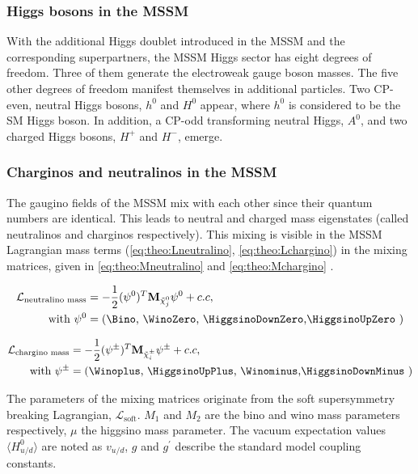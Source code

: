 \subsubsection{Higgs bosons in the MSSM}
With the additional Higgs doublet introduced in the MSSM and the corresponding superpartners, the MSSM Higgs sector has eight degrees of freedom.
Three of them generate the electroweak gauge boson masses. The five other degrees of freedom manifest themselves in additional particles. Two CP-even, neutral Higgs bosons, $h^0$ and $H^0$ appear, where $h^0$ is considered to be the SM Higgs boson. In addition, a CP-odd transforming neutral Higgs, $A^0$, and two charged Higgs bosons, $H^+$ and $H^-$, emerge.


\subsubsection{Charginos and neutralinos in the MSSM}
The gaugino fields of the MSSM mix with each other since their quantum numbers are identical. This leads to neutral and charged mass eigenstates (called neutralinos and charginos respectively). This mixing is visible in the MSSM Lagrangian mass terms (\eqref{eq:theo:Lneutralino}, \eqref{eq:theo:Lchargino}) in the mixing matrices,  given in \eqref{eq:theo:Mneutralino} and \eqref{eq:theo:Mchargino} \cite{SUSYPrimer}. 


\begin{align}
\begin{split} \mathcal{L}_\text{neutralino mass} &= - \frac{1}{2} (\psi^0)^T \textbf{M}_{\tilde{\chi}_j^0}\psi^0 + c.c , \\ 
\text{with  } \psi^0 &= \text{(\Bino, \WinoZero, \HiggsinoDownZero,\HiggsinoUpZero )} \end{split} \label{eq:theo:Lneutralino}
\end{align}

\begin{align}
\begin{split}
\mathcal{L}_\text{chargino mass} &= - \frac{1}{2} (\psi^\pm)^T \textbf{M}_{\tilde{\chi}_i^\pm}\psi^\pm + c.c , \\
\text{with  } \psi^\pm &= \text{(\Winoplus, \HiggsinoUpPlus, \Winominus,\HiggsinoDownMinus )} \end{split} \label{eq:theo:Lchargino}
\end{align}

The parameters of the mixing matrices originate from the soft supersymmetry breaking Lagrangian, $\mathcal{L}_\text{soft}$. $M_1$ and  $M_2$ are the bino and wino mass parameters respectively, $\mu$ the higgsino mass parameter. The vacuum expectation values $\langle H_{u/d}^0 \rangle$ are noted as $v_{u/d}$, $g$ and $g^\prime$ describe the standard model coupling constants. 

